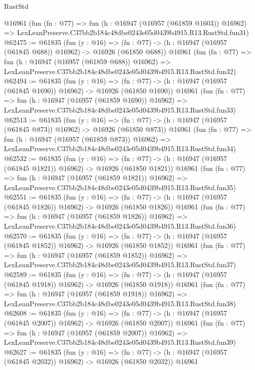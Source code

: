 \begin{lexlean}{RustStd}
\begin{coremodule}
    @16961
    (fun (fn : @77) =>
    fun (h : @16947 (@16957 (@61859 @1603)) @16962) =>
    LexLeanPreserve.C37bb2b184c48dbe0243e05d0439b4915.R13.RustStd.fun31)
@62475 := @61835
    (fun (y : @16) =>
    (fn : @77) -> (h : @16947 (@16957 (@61845 @688)) @16962) -> @16926 (@61850 @688))
    @16961
    (fun (fn : @77) =>
    fun (h : @16947 (@16957 (@61859 @688)) @16962) =>
    LexLeanPreserve.C37bb2b184c48dbe0243e05d0439b4915.R13.RustStd.fun32)
@62494 := @61835
    (fun (y : @16) =>
    (fn : @77) -> (h : @16947 (@16957 (@61845 @1690)) @16962) -> @16926 (@61850 @1690))
    @16961
    (fun (fn : @77) =>
    fun (h : @16947 (@16957 (@61859 @1690)) @16962) =>
    LexLeanPreserve.C37bb2b184c48dbe0243e05d0439b4915.R13.RustStd.fun33)
@62513 := @61835
    (fun (y : @16) =>
    (fn : @77) -> (h : @16947 (@16957 (@61845 @873)) @16962) -> @16926 (@61850 @873))
    @16961
    (fun (fn : @77) =>
    fun (h : @16947 (@16957 (@61859 @873)) @16962) =>
    LexLeanPreserve.C37bb2b184c48dbe0243e05d0439b4915.R13.RustStd.fun34)
@62532 := @61835
    (fun (y : @16) =>
    (fn : @77) -> (h : @16947 (@16957 (@61845 @1821)) @16962) -> @16926 (@61850 @1821))
    @16961
    (fun (fn : @77) =>
    fun (h : @16947 (@16957 (@61859 @1821)) @16962) =>
    LexLeanPreserve.C37bb2b184c48dbe0243e05d0439b4915.R13.RustStd.fun35)
@62551 := @61835
    (fun (y : @16) =>
    (fn : @77) -> (h : @16947 (@16957 (@61845 @1826)) @16962) -> @16926 (@61850 @1826))
    @16961
    (fun (fn : @77) =>
    fun (h : @16947 (@16957 (@61859 @1826)) @16962) =>
    LexLeanPreserve.C37bb2b184c48dbe0243e05d0439b4915.R13.RustStd.fun36)
@62570 := @61835
    (fun (y : @16) =>
    (fn : @77) -> (h : @16947 (@16957 (@61845 @1852)) @16962) -> @16926 (@61850 @1852))
    @16961
    (fun (fn : @77) =>
    fun (h : @16947 (@16957 (@61859 @1852)) @16962) =>
    LexLeanPreserve.C37bb2b184c48dbe0243e05d0439b4915.R13.RustStd.fun37)
@62589 := @61835
    (fun (y : @16) =>
    (fn : @77) -> (h : @16947 (@16957 (@61845 @1918)) @16962) -> @16926 (@61850 @1918))
    @16961
    (fun (fn : @77) =>
    fun (h : @16947 (@16957 (@61859 @1918)) @16962) =>
    LexLeanPreserve.C37bb2b184c48dbe0243e05d0439b4915.R13.RustStd.fun38)
@62608 := @61835
    (fun (y : @16) =>
    (fn : @77) -> (h : @16947 (@16957 (@61845 @2007)) @16962) -> @16926 (@61850 @2007))
    @16961
    (fun (fn : @77) =>
    fun (h : @16947 (@16957 (@61859 @2007)) @16962) =>
    LexLeanPreserve.C37bb2b184c48dbe0243e05d0439b4915.R13.RustStd.fun39)
@62627 := @61835
    (fun (y : @16) =>
    (fn : @77) -> (h : @16947 (@16957 (@61845 @2032)) @16962) -> @16926 (@61850 @2032))
    @16961

\end{coremodule}
\end{lexlean}
